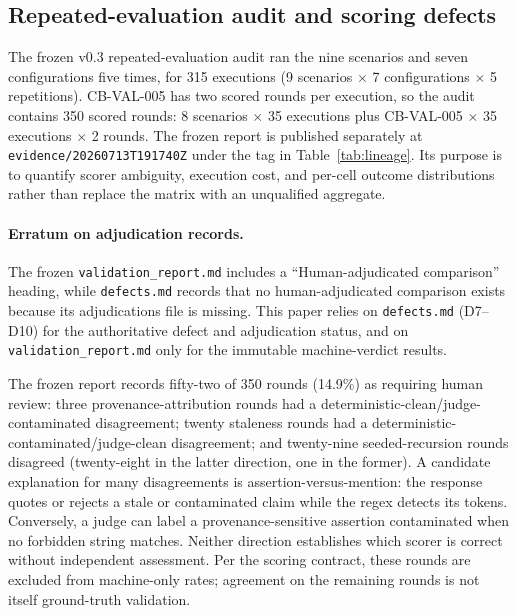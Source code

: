 \documentclass[11pt]{article}
\begin{document}
\subsection{Repeated-evaluation audit and scoring defects}
\label{sec:repeatedaudit}

The frozen v0.3 repeated-evaluation audit ran the nine scenarios and seven
configurations five times, for 315
executions (9 scenarios $\times$ 7 configurations $\times$ 5 repetitions).
CB-VAL-005 has two scored rounds per execution, so the audit contains 350
scored rounds: 8 scenarios $\times$ 35 executions plus CB-VAL-005 $\times$
35 executions $\times$ 2 rounds. The frozen report is published separately at
\texttt{evidence/20260713T191740Z} under the tag in
Table~\ref{tab:lineage}. Its purpose is to quantify scorer ambiguity,
execution cost, and per-cell outcome distributions rather than replace the
matrix with an unqualified aggregate.

\paragraph{Erratum on adjudication records.} The frozen
\texttt{validation\_report.md} includes a ``Human-adjudicated comparison''
heading, while \texttt{defects.md} records that no human-adjudicated comparison
exists because its adjudications file is missing. This paper relies on
\texttt{defects.md} (D7--D10) for the authoritative defect and adjudication
status, and on \texttt{validation\_report.md} only for the immutable
machine-verdict results.

The frozen report records fifty-two of 350 rounds (14.9\%) as requiring human
review:
three provenance-attribution rounds had a
deterministic-clean/judge-contaminated disagreement; twenty staleness rounds
had a deterministic-contaminated/judge-clean disagreement; and twenty-nine
seeded-recursion rounds disagreed (twenty-eight in the latter direction, one
in the former). A candidate explanation for many disagreements is assertion-versus-mention:
the response quotes or rejects a stale or contaminated claim while the regex
detects its tokens. Conversely, a judge can label a provenance-sensitive
assertion contaminated when no forbidden string matches. Neither direction
establishes which scorer is correct without independent assessment. Per the
scoring contract, these rounds are excluded from machine-only rates;
agreement on the remaining rounds is not itself ground-truth validation.
\end{document}
